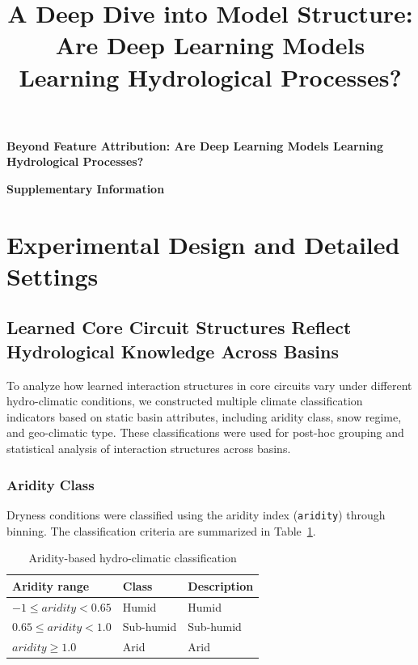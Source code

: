\documentclass[11pt]{article}
\title{A Deep Dive into Model Structure: Are Deep Learning Models Learning Hydrological Processes?}
\author{}
\date{}
\begin{document}

\begin{titlepage}
    \centering
    {\LARGE\bfseries Beyond Feature Attribution: Are Deep Learning Models Learning Hydrological Processes?\par}
    \vspace{2.8cm}
    {\Huge\bfseries Supplementary Information\par}
    \vfill
\end{titlepage}

\clearpage
{\hypersetup{linkcolor=black}
    \tableofcontents
}

\clearpage
{}
\setcounter{page}{1}
\section{Experimental Design and Detailed Settings}

\subsection{Learned Core Circuit Structures Reflect Hydrological Knowledge Across Basins}
\label{sec:knowledge}

To analyze how learned interaction structures in core circuits vary under different hydro-climatic conditions, we constructed multiple climate classification indicators based on static basin attributes, including aridity class, snow regime, and geo-climatic type\cite{hess-camels}. These classifications were used for post-hoc grouping and statistical analysis of interaction structures across basins.

\subsubsection*{Aridity Class}

Dryness conditions were classified using the aridity index (\texttt{aridity}) through binning\cite{zomer2022version}. The classification criteria are summarized in Table~\ref{tab:aridity_class}.

\begin{table}[htbp]
    \centering
    \caption{Aridity-based hydro-climatic classification}
    \label{tab:aridity_class}
    \begin{tabular*}{\textwidth}{@{\extracolsep{\fill}}lll}
        \toprule
        \textbf{Aridity range} & \textbf{Class} & \textbf{Description} \\
        \midrule
        $-1 \le aridity < 0.65$ & Humid & Humid \\
        $0.65 \le aridity < 1.0$ & Sub-humid & Sub-humid \\
        $aridity \ge 1.0$ & Arid & Arid \\
        \bottomrule
    \end{tabular*}
\end{table}
\end{document}
